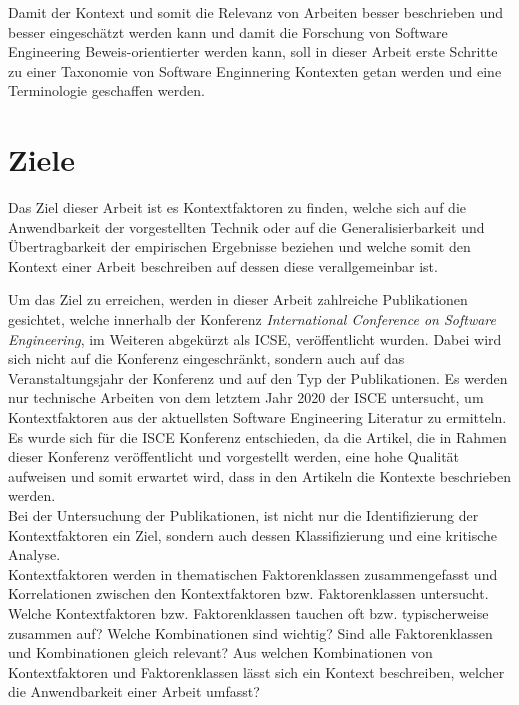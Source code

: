 Damit der Kontext und somit die Relevanz von Arbeiten besser beschrieben und besser eingeschätzt werden kann und damit die Forschung von Software Engineering Beweis-orientierter werden kann, soll in dieser Arbeit erste Schritte zu einer Taxonomie von Software Enginnering Kontexten getan werden und eine Terminologie geschaffen werden.

\section{Ziele}
Das Ziel dieser Arbeit ist es Kontextfaktoren zu finden, welche sich auf die Anwendbarkeit der vorgestellten Technik oder auf die Generalisierbarkeit und Übertragbarkeit der empirischen Ergebnisse beziehen und welche somit den Kontext einer Arbeit beschreiben auf dessen diese verallgemeinbar ist.

Um das Ziel zu erreichen, werden in dieser Arbeit zahlreiche Publikationen gesichtet, welche innerhalb der Konferenz \textit{International Conference on Software Engineering}, im Weiteren abgekürzt als ICSE, veröffentlicht wurden. Dabei wird sich nicht auf die Konferenz eingeschränkt, sondern auch auf das Veranstaltungsjahr der Konferenz und auf den Typ der Publikationen. Es werden nur technische Arbeiten von dem letztem Jahr 2020 der ISCE untersucht, um Kontextfaktoren aus der aktuellsten Software Engineering Literatur zu ermitteln. Es wurde sich für die ISCE Konferenz entschieden, da die Artikel, die in Rahmen dieser Konferenz veröffentlicht und vorgestellt werden, eine hohe Qualität aufweisen und somit erwartet wird, dass in den Artikeln die Kontexte beschrieben werden. \\

Bei der Untersuchung der Publikationen, ist nicht nur die Identifizierung der Kontextfaktoren ein Ziel, sondern auch dessen Klassifizierung und eine kritische Analyse. \\
Kontextfaktoren werden in thematischen Faktorenklassen zusammengefasst und Korrelationen zwischen den Kontextfaktoren bzw. Faktorenklassen untersucht. \\
Welche Kontextfaktoren bzw. Faktorenklassen tauchen oft bzw. typischerweise zusammen auf? Welche Kombinationen sind wichtig? Sind alle Faktorenklassen und Kombinationen gleich relevant? Aus welchen Kombinationen von Kontextfaktoren und Faktorenklassen lässt sich ein Kontext beschreiben, welcher die Anwendbarkeit einer Arbeit umfasst? \\

